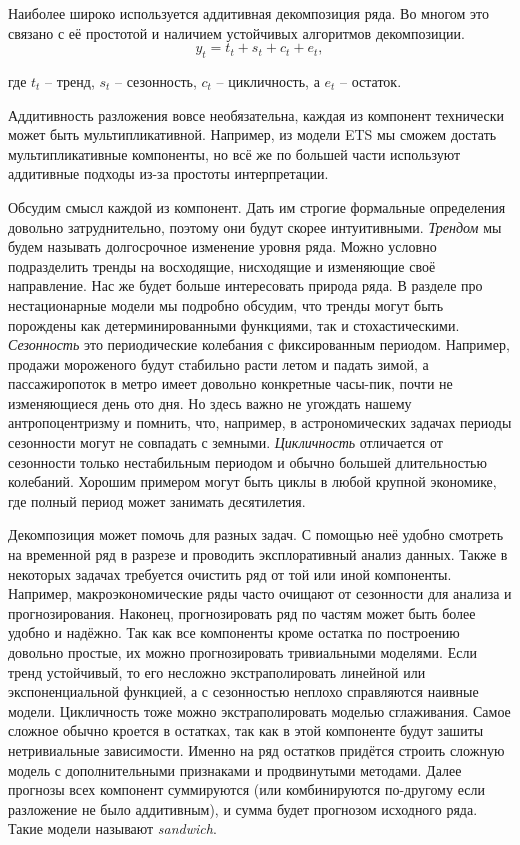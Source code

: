 \documentclass[12pt,fleqn]{article}
\begin{document}
	
	Наиболее широко используется аддитивная декомпозиция ряда. Во многом это связано с её простотой и наличием устойчивых алгоритмов декомпозиции. 
	$$y_t = t_t + s_t + c_t + e_t,$$
	
	где $t_t$ -- тренд, $s_t$ -- сезонность,  $c_t$ -- цикличность, а $e_t$ -- остаток.
	
	Аддитивность разложения вовсе необязательна, каждая из компонент технически может быть мультипликативной. Например, из модели ETS мы сможем достать мультипликативные компоненты, но всё же по большей части используют аддитивные подходы из-за простоты интерпретации.
	
	Обсудим смысл каждой из компонент.
	Дать им строгие формальные определения довольно затруднительно, поэтому они будут скорее интуитивными. \emph{Трендом} мы будем называть долгосрочное изменение уровня ряда.
	Можно условно подразделить тренды на восходящие, нисходящие и изменяющие своё направление. Нас же будет больше интересовать природа ряда. В разделе про нестационарные модели мы подробно обсудим, что тренды могут быть порождены как детерминированными функциями, так и стохастическими. \emph{Сезонность} это периодические колебания с фиксированным периодом. Например, продажи мороженого будут стабильно расти летом и падать зимой, а пассажиропоток в метро имеет довольно конкретные часы-пик, почти не изменяющиеся день ото дня. Но здесь важно не угождать нашему антропоцентризму и помнить, что, например, в астрономических задачах периоды сезонности могут не совпадать с земными. \emph{Цикличность} отличается от сезонности только нестабильным периодом и обычно большей длительностью колебаний. Хорошим примером могут быть циклы в любой крупной экономике, где полный период может занимать десятилетия.
	
	Декомпозиция может помочь для разных задач. С помощью неё удобно смотреть на временной ряд в разрезе и проводить эксплоративный анализ данных. Также в некоторых задачах требуется очистить ряд от той или иной компоненты. Например, макроэкономические ряды часто очищают от сезонности для анализа и прогнозирования. Наконец, прогнозировать ряд по частям может быть более удобно и надёжно. Так как все компоненты кроме остатка по построению довольно простые, их можно прогнозировать тривиальными моделями. Если тренд устойчивый, то его несложно экстраполировать линейной или экспоненциальной функцией, а с сезонностью неплохо справляются наивные модели. Цикличность тоже можно экстраполировать моделью сглаживания. Самое сложное обычно кроется в остатках, так как в этой компоненте будут зашиты нетривиальные зависимости. Именно на ряд остатков придётся строить сложную модель с дополнительными признаками и продвинутыми методами. Далее прогнозы всех компонент суммируются (или комбинируются по-другому если разложение не было аддитивным), и сумма будет прогнозом исходного ряда. Такие модели называют \emph{sandwich}.
\end{document}
